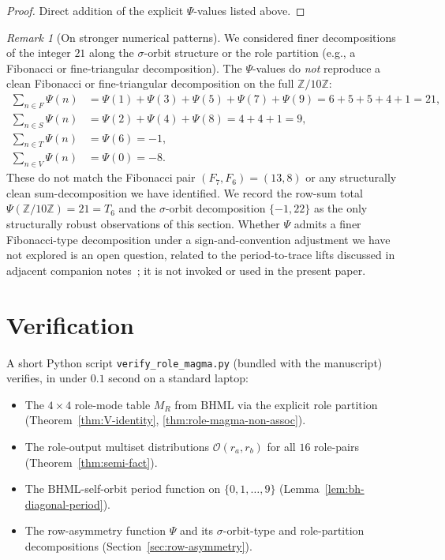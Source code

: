 \documentclass[11pt,reqno]{amsart}
\theoremstyle{plain}
\theoremstyle{definition}
\theoremstyle{remark}
\newtheorem*{remark}{Remark}
\newcommand{\Z}{\mathbb{Z}}
\newcommand{\BH}{\mathrm{BHML}}
\newcommand{\sig}{\sigma}
\newcommand{\Zten}{\Z/10\Z}
\begin{document}
\begin{proof}
Direct addition of the explicit $\Psi$-values listed above.
\end{proof}

\begin{remark}[On stronger numerical patterns]\label{rem:no-fibonacci}
We considered finer decompositions of the integer $21$ along the
$\sig$-orbit structure or the role partition (e.g., a Fibonacci
or fine-triangular decomposition). The $\Psi$-values do
\emph{not} reproduce a clean Fibonacci or fine-triangular
decomposition on the full $\Zten$:
\begin{align*}
\sum_{n \in F} \Psi(n) &= \Psi(1) + \Psi(3) + \Psi(5) + \Psi(7)
+ \Psi(9) = 6 + 5 + 5 + 4 + 1 = 21, \\
\sum_{n \in S} \Psi(n) &= \Psi(2) + \Psi(4) + \Psi(8) = 4 + 4 + 1
= 9, \\
\sum_{n \in T} \Psi(n) &= \Psi(6) = -1, \\
\sum_{n \in V} \Psi(n) &= \Psi(0) = -8.
\end{align*}
These do not match the Fibonacci pair $(F_7, F_6) = (13, 8)$ or
any structurally clean sum-decomposition we have identified. We
record the row-sum total $\Psi(\Zten) = 21 = T_6$ and the
$\sig$-orbit decomposition $\{-1, 22\}$ as the only structurally
robust observations of this section. Whether $\Psi$ admits a
finer Fibonacci-type decomposition under a sign-and-convention
adjustment we have not explored is an open question, related to
the period-to-trace lifts discussed in adjacent companion
notes~\cite{FourCore}; it is not invoked or used in the present
paper.
\end{remark}

\section{Verification}

A short Python script
\texttt{verify\_role\_magma.py} (bundled with the manuscript)
verifies, in under $0.1$ second on a standard laptop:
\begin{itemize}\setlength\itemsep{2pt}
\item The $4 \times 4$ role-mode table $M_R$ from $\BH$ via the
explicit role partition (Theorem~\ref{thm:V-identity},
\ref{thm:role-magma-non-assoc}).
\item The role-output multiset distributions
$\mathcal{O}(r_a, r_b)$ for all $16$ role-pairs
(Theorem~\ref{thm:semi-fact}).
\item The $\BH$-self-orbit period function on
$\{0, 1, \ldots, 9\}$ (Lemma~\ref{lem:bh-diagonal-period}).
\item The row-asymmetry function $\Psi$ and its
$\sig$-orbit-type and role-partition decompositions
(Section~\ref{sec:row-asymmetry}).
\end{itemize}
\end{document}
